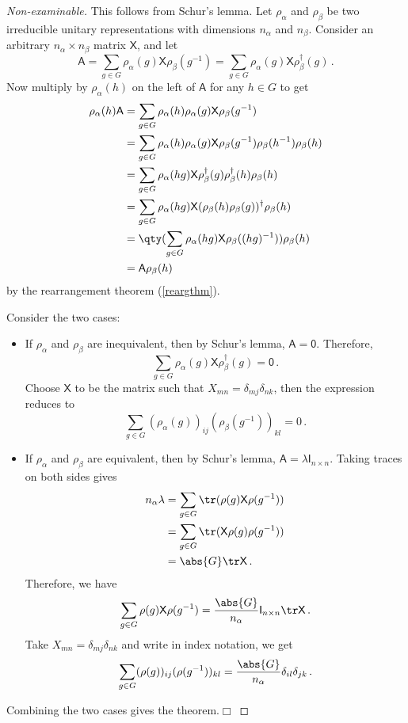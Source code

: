 \documentclass{article}
\theoremstyle{plain}\theoremheaderfont{\normalfont\itshape}\theorembodyfont{\rmfamily}\theoremseparator{.}\newtheorem*{rem}{Remark}\newtheorem*{ex}{Example}\newtheorem*{proof}{Proof}\newtheorem*{altp}{Alternative proof}
\theoremstyle{plain}\theoremheaderfont{\normalfont\bfseries}\theorembodyfont{\rmfamily}\theoremseparator{.}\newtheorem{thm}{Theorem}[section]\newtheorem{lem}[thm]{Lemma}\newtheorem{prop}[thm]{Proposition}\newtheorem*{cor}{Corollary}\newtheorem{defn}[thm]{Definition}\newtheorem{clm}[thm]{Claim}\newtheorem{clminproof}{Claim}
\theoremstyle{break}\theoremheaderfont{\normalfont\itshape}\theorembodyfont{\rmfamily}\theoremseparator{.\medskip}\newtheorem*{proofskip}{Proof}\newtheorem*{exs}{Examples}\newtheorem*{rems}{Remarks}
\theoremstyle{break}\theoremheaderfont{\normalfont\bfseries}\theorembodyfont{\rmfamily}\theoremseparator{.\medskip}\newtheorem{lemskip}[thm]{Lemma}\newtheorem{defnskip}[thm]{Definition}\newtheorem{propskip}[thm]{Proposition}\newtheorem{thmskip}[thm]{Theorem}
\numberwithin{equation}{section}
\newcommand{\qed}{\hfill\ensuremath{\Box}}
\begin{document}
	\begin{proof}[Non-examinable]
		This follows from Schur's lemma. Let \(\rho_\alpha\) and \(\rho_\beta\) be two irreducible unitary representations with dimensions \(n_\alpha\) and \(n_\beta\). Consider an arbitrary \(n_\alpha\times n_\beta\) matrix \(\mathsf{X}\), and let
		\[\mathsf{A}=\sum_{g\in G}\rho_\alpha(g)\mathsf{X}\rho_\beta(g^{-1})=\sum_{g\in G}\rho_\alpha(g)\mathsf{X}\rho^\dagger_\beta(g)\,.\]
		Now multiply by \(\rho_\alpha(h)\) on the left of \(\mathsf{A}\) for any \(h\in G\) to get
		\begin{align*}
			\rho_\alpha(h)\mathsf{A}&=\sum_{g\in G}\rho_\alpha(h)\rho_\alpha(g)\mathsf{X}\rho_\beta(g^{-1})\\
			&=\sum_{g\in G}\rho_\alpha(h)\rho_\alpha(g)\mathsf{X}\rho_\beta(g^{-1})\rho_\beta(h^{-1})\rho_\beta(h)\\
			&=\sum_{g\in G}\rho_\alpha(hg)\mathsf{X}\rho^\dagger_\beta(g)\rho^\dagger_\beta(h)\rho_\beta(h)\\
			&=\sum_{g\in G}\rho_\alpha(hg)\mathsf{X}(\rho_\beta(h)\rho_\beta(g))^\dagger\rho_\beta(h)\\
			&=\qty(\sum_{g\in G}\rho_\alpha(hg)\mathsf{X}\rho_\beta((hg)^{-1}))\rho_\beta(h)\\
			&=\mathsf{A}\rho_\beta(h)
		\end{align*}
		by the rearrangement theorem (\cref{reargthm}).
		
		Consider the two cases:
		\begin{itemize}[topsep=0pt]
			\item If \(\rho_\alpha\) and \(\rho_\beta\) are inequivalent, then by Schur's lemma, \(\mathsf{A}=\mathsf{0}\). Therefore,
			\[\sum_{g\in G}\rho_\alpha(g)\mathsf{X}\rho^\dagger_\beta(g)=\mathsf{0}\,.\]
			Choose \(\mathsf{X}\) to be the matrix such that \(X_{mn}=\delta_{mj}\delta_{nk}\), then the expression reduces to
			\[\sum_{g\in G}(\rho_\alpha(g))_{ij}(\rho_\beta(g^{-1}))_{kl}=0\,.\]
			\item If \(\rho_\alpha\) and \(\rho_\beta\) are equivalent, then by Schur's lemma, \(\mathsf{A}=\lambda\mathsf{I}_{n\times n}\). Taking traces on both sides gives
			\begin{align*}
				n_\alpha\lambda&=\sum_{g\in G}\tr(\rho(g)\mathsf{X}\rho(g^{-1}))\\
				&=\sum_{g\in G}\tr(\mathsf{X}\rho(g)\rho(g^{-1}))\\
				&=\abs{G}\tr\mathsf{X}\,.
			\end{align*}
			Therefore, we have
			\[\sum_{g\in G}\rho(g)\mathsf{X}\rho(g^{-1})=\frac{\abs{G}}{n_\alpha}\mathsf{I}_{n\times n}\tr\mathsf{X}\,.\]
			Take \(X_{mn}=\delta_{mj}\delta_{nk}\) and write in index notation, we get
			\[\sum_{g\in G}(\rho(g))_{ij}(\rho(g^{-1}))_{kl}=\frac{\abs{G}}{n_\alpha}\delta_{il}\delta_{jk}\,.\]
		\end{itemize}

		Combining the two cases gives the theorem.\qed
	\end{proof}
\end{document}
